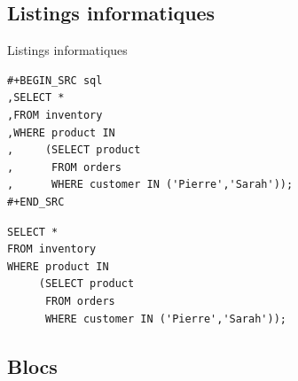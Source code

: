 \documentclass[presentation,t,hideothersubsections]{beamer}
\begin{document}
\subsection{Listings informatiques}
\label{sec-3-7}

\begin{frame}[fragile,label=sec-3-7-1]{Listings informatiques}
 \lstset{language=org,numbers=none}
\begin{lstlisting}
#+BEGIN_SRC sql
,SELECT *
,FROM inventory
,WHERE product IN
,     (SELECT product
,      FROM orders
,      WHERE customer IN ('Pierre','Sarah'));
#+END_SRC
\end{lstlisting}

\lstset{language=SQL,numbers=none}
\begin{lstlisting}
SELECT *
FROM inventory
WHERE product IN
     (SELECT product
      FROM orders
      WHERE customer IN ('Pierre','Sarah'));
\end{lstlisting}
\end{frame}
\subsection{Blocs}
\label{sec-3-8}
\end{document}

